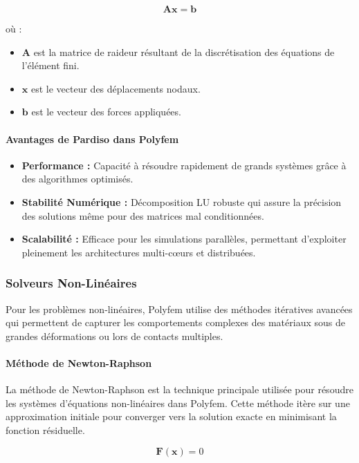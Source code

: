 \[
\mathbf{A} \mathbf{x} = \mathbf{b}
\]

où :
\begin{itemize}
    \item \( \mathbf{A} \) est la matrice de raideur résultant de la discrétisation des équations de l'élément fini.
    \item \( \mathbf{x} \) est le vecteur des déplacements nodaux.
    \item \( \mathbf{b} \) est le vecteur des forces appliquées.
\end{itemize}

\paragraph{Avantages de Pardiso dans Polyfem}
\begin{itemize}
    \item \textbf{Performance :} Capacité à résoudre rapidement de grands systèmes grâce à des algorithmes optimisés.
    \item \textbf{Stabilité Numérique :} Décomposition LU robuste qui assure la précision des solutions même pour des matrices mal conditionnées.
    \item \textbf{Scalabilité :} Efficace pour les simulations parallèles, permettant d'exploiter pleinement les architectures multi-cœurs et distribuées.
\end{itemize}

\subsubsection{Solveurs Non-Linéaires}

Pour les problèmes non-linéaires, Polyfem utilise des méthodes itératives avancées qui permettent de capturer les comportements complexes des matériaux sous de grandes déformations ou lors de contacts multiples.

\paragraph{Méthode de Newton-Raphson}

La méthode de Newton-Raphson est la technique principale utilisée pour résoudre les systèmes d'équations non-linéaires dans Polyfem. Cette méthode itère sur une approximation initiale pour converger vers la solution exacte en minimisant la fonction résiduelle.

\[
\mathbf{F}(\mathbf{x}) = 0
\]

